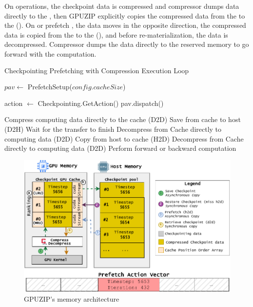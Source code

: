 \documentclass[Ingles]{ic-tese-v3}
\begin{document}
On \save operations, the checkpoint data is compressed and compressor dumps data directly to the \cache {}, then GPUZIP explicitly copies the compressed data from the \cache to the \pool (\dth). On \restore {} or prefetch , the data moves in the opposite direction, the compressed data is copied from the \pool to the \cache (\htd), and before re-materialization, the data is decompressed. Compressor dumps the data directly to the \awave reserved memory to go forward with the computation.

\begin{algorithm}
\caption{Checkpointing Prefetching with Compression Execution Loop}
\label{alg:gpuzip_loop}
\begin{algorithmic}[1]
\STATE $pav \gets$ PrefetchSetup($config.cacheSize$)

    \STATE action $\gets$ Checkpointing.GetAction()
        \STATE pav.dispatch()
    \ENDIF
    
        \STATE Compress computing data directly to the cache (D2D)
        \STATE Save from cache to host (D2H)
                \STATE Wait for the transfer to finish
            \ENDIF
            \STATE Decompress from Cache directly to computing data (D2D) 
        \ELSE
            \STATE Copy from host to cache (H2D)
            \STATE Decompress from Cache directly to computing data (D2D)
        \ENDIF
        \STATE Perform forward or backward computation
    \ENDIF
\ENDWHILE
\end{algorithmic}
\end{algorithm}


\begin{figure}[]
  \centering
  \includegraphics[width=0.95\linewidth,trim={0 0 0 0},clip]{figures/arch_gpuzip.pdf}
  \caption[Memory architecture diagram (\checkpointprefetching + \compression)]{GPUZIP's memory architecture}
  \label{fig:arch_gpuzip}
\end{figure}
\end{document}
